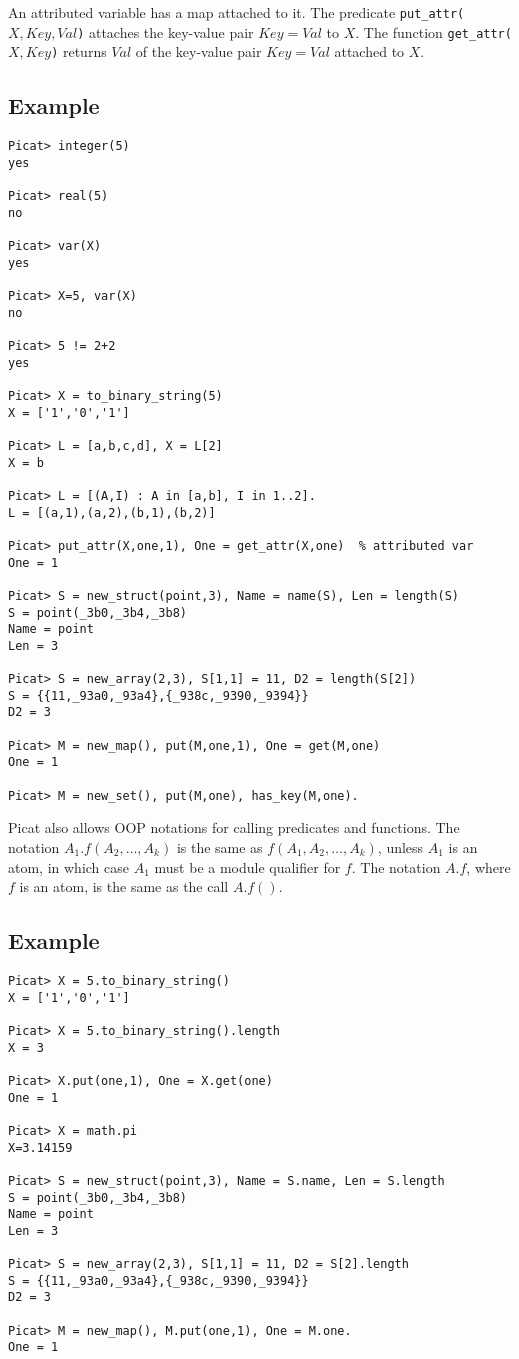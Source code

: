 An attributed variable has a map attached to it. The predicate \texttt{put\_attr($X,Key,Val$)} attaches the key-value pair \texttt{$Key$$=$$Val$} to \texttt{$X$}. The function \texttt{get\_attr($X,Key$)} returns \texttt{$Val$} of the key-value pair \texttt{$Key$$=$$Val$} attached to \texttt{$X$}. 

\subsection*{Example}
\begin{verbatim}
Picat> integer(5)
yes

Picat> real(5)
no

Picat> var(X)
yes

Picat> X=5, var(X)
no

Picat> 5 != 2+2
yes

Picat> X = to_binary_string(5)
X = ['1','0','1']

Picat> L = [a,b,c,d], X = L[2]
X = b

Picat> L = [(A,I) : A in [a,b], I in 1..2].
L = [(a,1),(a,2),(b,1),(b,2)]

Picat> put_attr(X,one,1), One = get_attr(X,one)  % attributed var
One = 1

Picat> S = new_struct(point,3), Name = name(S), Len = length(S)
S = point(_3b0,_3b4,_3b8)
Name = point
Len = 3

Picat> S = new_array(2,3), S[1,1] = 11, D2 = length(S[2])
S = {{11,_93a0,_93a4},{_938c,_9390,_9394}}
D2 = 3

Picat> M = new_map(), put(M,one,1), One = get(M,one)
One = 1

Picat> M = new_set(), put(M,one), has_key(M,one).
\end{verbatim}

Picat also allows OOP notations for calling predicates and functions. The notation \texttt{$A_1.f(A_2,\ldots,A_k)$} is the same as \texttt{$f(A_1,A_2,\ldots,A_k)$}, unless $A_1$ is an atom, in which case $A_1$ must be a module qualifier for $f$.  The notation $A.f$, where $f$ is an atom, is the same as the call \texttt{$A.f()$}. 

\subsection*{Example}
\begin{verbatim}
Picat> X = 5.to_binary_string()
X = ['1','0','1']

Picat> X = 5.to_binary_string().length
X = 3

Picat> X.put(one,1), One = X.get(one)
One = 1

Picat> X = math.pi
X=3.14159

Picat> S = new_struct(point,3), Name = S.name, Len = S.length
S = point(_3b0,_3b4,_3b8)
Name = point
Len = 3

Picat> S = new_array(2,3), S[1,1] = 11, D2 = S[2].length
S = {{11,_93a0,_93a4},{_938c,_9390,_9394}}
D2 = 3

Picat> M = new_map(), M.put(one,1), One = M.one.
One = 1
\end{verbatim}

